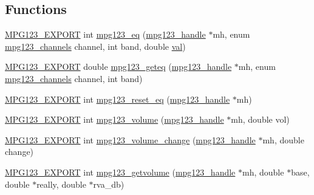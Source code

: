 \subsection*{Functions}
\begin{DoxyCompactItemize}
\item 
\mbox{\hyperlink{mpg123_8h_a2ba98cfba3f760879df70e755b2a61cc}{M\+P\+G123\+\_\+\+E\+X\+P\+O\+RT}} int \mbox{\hyperlink{group__mpg123__voleq_gae5121afbdada36c3dc3dd9450dfaaf07}{mpg123\+\_\+eq}} (\mbox{\hyperlink{group__mpg123__init_ga6728e2839a395f3a07d4514da659faca}{mpg123\+\_\+handle}} $\ast$mh, enum \mbox{\hyperlink{group__mpg123__voleq_gaf6ae0d8c593d295c36e7d20e9f892840}{mpg123\+\_\+channels}} channel, int band, double \mbox{\hyperlink{_s_d_l__opengl__glext_8h_a26942fd2ed566ef553eae82d2c109c8f}{val}})
\item 
\mbox{\hyperlink{mpg123_8h_a2ba98cfba3f760879df70e755b2a61cc}{M\+P\+G123\+\_\+\+E\+X\+P\+O\+RT}} double \mbox{\hyperlink{group__mpg123__voleq_gad03e2f5ca346ae488f708551db994ff7}{mpg123\+\_\+geteq}} (\mbox{\hyperlink{group__mpg123__init_ga6728e2839a395f3a07d4514da659faca}{mpg123\+\_\+handle}} $\ast$mh, enum \mbox{\hyperlink{group__mpg123__voleq_gaf6ae0d8c593d295c36e7d20e9f892840}{mpg123\+\_\+channels}} channel, int band)
\item 
\mbox{\hyperlink{mpg123_8h_a2ba98cfba3f760879df70e755b2a61cc}{M\+P\+G123\+\_\+\+E\+X\+P\+O\+RT}} int \mbox{\hyperlink{group__mpg123__voleq_ga3f118a7b7c333066ccad9006d933202a}{mpg123\+\_\+reset\+\_\+eq}} (\mbox{\hyperlink{group__mpg123__init_ga6728e2839a395f3a07d4514da659faca}{mpg123\+\_\+handle}} $\ast$mh)
\item 
\mbox{\hyperlink{mpg123_8h_a2ba98cfba3f760879df70e755b2a61cc}{M\+P\+G123\+\_\+\+E\+X\+P\+O\+RT}} int \mbox{\hyperlink{group__mpg123__voleq_gad3cf821056ba53d4a9caca2671485dc4}{mpg123\+\_\+volume}} (\mbox{\hyperlink{group__mpg123__init_ga6728e2839a395f3a07d4514da659faca}{mpg123\+\_\+handle}} $\ast$mh, double vol)
\item 
\mbox{\hyperlink{mpg123_8h_a2ba98cfba3f760879df70e755b2a61cc}{M\+P\+G123\+\_\+\+E\+X\+P\+O\+RT}} int \mbox{\hyperlink{group__mpg123__voleq_gaa0897be03a78daf11e28c0e7263a0ae1}{mpg123\+\_\+volume\+\_\+change}} (\mbox{\hyperlink{group__mpg123__init_ga6728e2839a395f3a07d4514da659faca}{mpg123\+\_\+handle}} $\ast$mh, double change)
\item 
\mbox{\hyperlink{mpg123_8h_a2ba98cfba3f760879df70e755b2a61cc}{M\+P\+G123\+\_\+\+E\+X\+P\+O\+RT}} int \mbox{\hyperlink{group__mpg123__voleq_ga33be27860acfd34d5d2a1d17cf72a15a}{mpg123\+\_\+getvolume}} (\mbox{\hyperlink{group__mpg123__init_ga6728e2839a395f3a07d4514da659faca}{mpg123\+\_\+handle}} $\ast$mh, double $\ast$base, double $\ast$really, double $\ast$rva\+\_\+db)
\end{DoxyCompactItemize}


